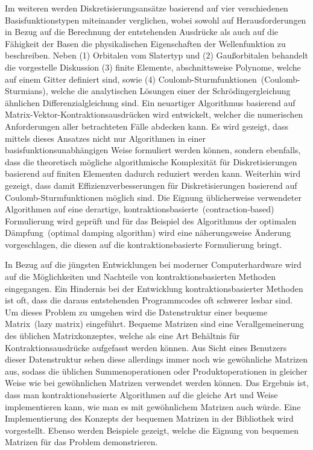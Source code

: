 Im weiteren werden Diskretisierungsansätze basierend auf vier verschiedenen
Basisfunktionstypen miteinander verglichen,
wobei sowohl auf Herausforderungen in Bezug auf die Berechnung
der entstehenden Ausdrücke
als auch auf die Fähigkeit der Basen
die physikalischen Eigenschaften der Wellenfunktion zu beschreiben.
Neben (1) Orbitalen vom Slatertyp und (2) Gaußorbitalen
behandelt die vorgestelle Diskussion
(3) finite Elemente,
abschnittsweise Polynome, welche auf einem Gitter definiert sind,
sowie (4) Coulomb-Sturmfunktionen~(Coulomb-Sturmians),
welche die analytischen Lösungen einer der Schrödingergleichung
ähnlichen Differenzialgleichung sind.
Ein neuartiger Algorithmus basierend auf Matrix-Vektor-Kontraktionsausdrücken
wird entwickelt,
welcher die numerischen Anforderungen aller betrachteten Fälle abdecken kann.
Es wird gezeigt, dass mittels dieses Ansatzes
nicht nur \SCF Algorithmen in einer basisfunktionsunabhängigen Weise
formuliert werden können,
sondern ebenfalls,
dass die theoretisch mögliche algorithmische Komplexität
für Diskretisierungen basierend auf finiten Elementen
dadurch reduziert werden kann.
Weiterhin wird gezeigt,
dass damit
Effizienzverbesserungen für Diskretisierungen basierend auf Coulomb-Sturmfunktionen
möglich sind.
Die Eignung üblicherweise verwendeter \SCF Algorithmen
auf eine derartige, kontraktionsbasierte~(contraction-based)
Formulierung wird geprüft
und für das Beispiel des Algorithmus der optimalen Dämpfung~(optimal damping algorithm)
wird eine näherungsweise Änderung vorgeschlagen,
die diesen auf die kontraktionsbasierte Formulierung bringt.

In Bezug auf die jüngsten Entwicklungen bei moderner
Computerhardware
wird auf die Möglichkeiten und Nachteile
von kontraktionsbasierten Methoden eingegangen.
Ein Hindernis bei der Entwicklung kontraktionsbasierter Methoden
ist oft, dass die daraus entstehenden Programmcodes
oft schwerer lesbar sind.
Um dieses Problem zu umgehen wird die Datenstruktur
einer bequeme Matrix~(lazy matrix) eingeführt.
Bequeme Matrizen sind eine Verallgemeinerung des üblichen Matrixkonzeptes,
welche als eine Art Behältnis für Kontraktionsausdrücke aufgefasst
werden können.
Aus Sicht eines Benutzers dieser Datenstruktur
sehen diese allerdings immer noch wie gewöhnliche Matrizen aus,
sodass die üblichen Summenoperationen oder Produktoperationen
in gleicher Weise wie bei gewöhnlichen Matrizen verwendet werden können.
Das Ergebnis ist,
dass man kontraktionsbasierte Algorithmen auf die gleiche Art und Weise
implementieren kann,
wie man es mit gewöhnlichem Matrizen auch würde.
Eine Implementierung des Konzepts der bequemen Matrizen in der
Bibliothek \lazyten wird vorgestellt.
Ebenso werden Beispiele gezeigt,
welche die Eignung von bequemen Matrizen für das \HF Problem demonstrieren.

